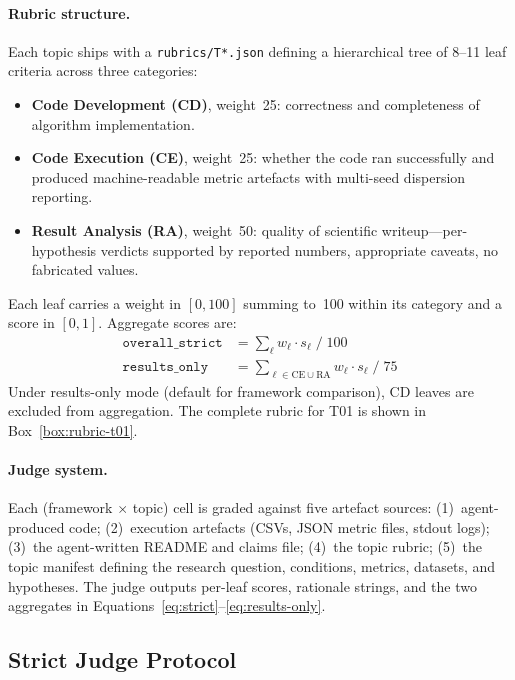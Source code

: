 \paragraph{Rubric structure.}
Each topic ships with a \texttt{rubrics/T*.json} defining a hierarchical tree of 8--11 leaf criteria across three categories:
\begin{itemize}[nosep,leftmargin=*]
\item \textbf{Code Development (CD)}, weight~25: correctness and completeness of algorithm implementation.
\item \textbf{Code Execution (CE)}, weight~25: whether the code ran successfully and produced machine-readable metric artefacts with multi-seed dispersion reporting.
\item \textbf{Result Analysis (RA)}, weight~50: quality of scientific writeup---per-hypothesis verdicts supported by reported numbers, appropriate caveats, no fabricated values.
\end{itemize}
Each leaf carries a weight in $[0,100]$ summing to~100 within its category and a score in $[0,1]$.
Aggregate scores are:
\begin{align}
\texttt{overall\_strict} &= \textstyle\sum_{\ell} w_\ell \cdot s_\ell \;/\; 100 \label{eq:strict} \\
\texttt{results\_only}   &= \textstyle\sum_{\ell \in \text{CE} \cup \text{RA}} w_\ell \cdot s_\ell \;/\; 75 \label{eq:results-only}
\end{align}
Under results-only mode (default for framework comparison), CD leaves are excluded from aggregation.
The complete rubric for T01 is shown in Box~\ref{box:rubric-t01}.

\paragraph{Judge system.}
Each (framework $\times$ topic) cell is graded against five artefact sources:
(1)~agent-produced code; (2)~execution artefacts (CSVs, JSON metric files, stdout logs); (3)~the agent-written README and claims file; (4)~the topic rubric; (5)~the topic manifest defining the research question, conditions, metrics, datasets, and hypotheses.
The judge outputs per-leaf scores, rationale strings, and the two aggregates in Equations~\ref{eq:strict}--\ref{eq:results-only}.

\subsection{Strict Judge Protocol}
\label{app:strict-judge}

